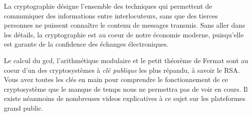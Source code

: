 \documentclass[french,course,oneside,theoremnosection]{lecture}
\newenvironment{further}[1]
{\begin{tcolorbox}[colframe=gray!50, colback=gray!5, arc=0pt, outer arc=0pt, boxrule=0.5pt, title=#1, breakable]}
{\end{tcolorbox}}
\begin{document}
\begin{further}{Crytpographie: les RSA}
La cryptographie désigne l'ensemble des techniques qui permettent de communiquer des informations entre interlocuteurs, sans que des tierces personnes ne puissent connaître le contenu de messages transmis. Sans aller dans les détails, la cryptographie est au coeur de notre économie moderne, puisqu'elle est garante de la confidence des échanges électroniques. 


Le calcul du gcd, l'arithmétique modulaire et le petit théorème de Fermat sont au coeur d'un des cryptosystèmes à \emph{clé publique} les plus répandu, à savoir le RSA. Vous avez toutes les clés en main pour comprendre le fonctionnement de ce cryptosystème que le manque de temps nous ne permettra pas de voir en cours. Il existe néanmoins de nombreuses videos explicatives à ce sujet sur les plateformes grand public.
\end{further}
\end{document}
